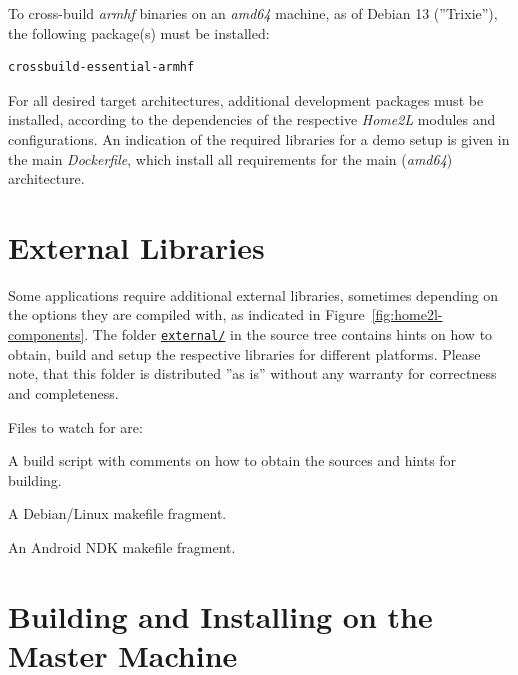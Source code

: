 \documentclass[12pt,english,parskip=half,headheight=19pt]{scrreprt}
\renewenvironment{description}[1][8ex]
  {\list{}{\labelwidth=5ex \leftmargin=#1 \let\makelabel\descriptionlabel}}
  {\endlist}
\newcommand{\lst}[1]{\colorbox{lstbackground}{\footnotesize\code{#1}}}
\newcommand{\refsrc}[1]{\href{#1}{\texttt{#1}}}     %
\begin{document}
To cross-build \textit{armhf} binaries on an \textit{amd64} machine, as of Debian 13 (''Trixie''), the following package(s) must be installed:
\begin{lstlisting}
crossbuild-essential-armhf
\end{lstlisting}

For all desired target architectures, additional development packages must be installed, according to the dependencies of the respective \textit{Home2L} modules and configurations. An indication of the required libraries for a demo setup is given in the main \textit{Dockerfile}, which install all requirements for the main (\textit{amd64}) architecture.





\section{External Libraries}
\label{sec:installing-external}


Some applications require additional external libraries, sometimes depending on the options they are compiled with, as indicated in Figure~\ref{fig:home2l-components}. The folder \refsrc{external/} in the source tree contains hints on how to obtain, build and setup the respective libraries for different platforms. Please note, that this folder is distributed ''as is'' without any warranty for correctness and completeness.

Files to watch for are:

\begin{description}
\item[\lst{prebuild.sh}:]
  A build script with comments on how to obtain the sources and hints for building.
\item[\lst{Debian.mk}:]
  A Debian/Linux makefile fragment.
\item[\lst{Android.mk}:]
  An Android NDK makefile fragment.
\end{description}





\section{Building and Installing on the Master Machine}
\label{sec:installing-compiling}
\end{document}
